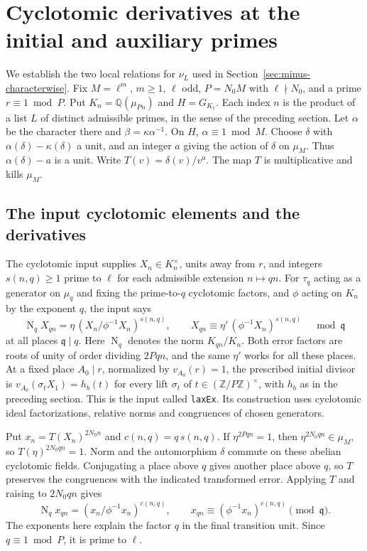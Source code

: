 \section{Cyclotomic derivatives at the initial and auxiliary primes}
\label{sec:minus-derivatives}

We establish the two local relations for \(\nu_L\) used in
Section~\ref{sec:minus-characterwise}. Fix \(M=\ell^m\), \(m\ge1\),
\(\ell\) odd, \(P=N_0M\) with \(\ell\nmid N_0\), and a prime
\(r\equiv1\bmod P\). Put \(K_n=\mathbb Q(\mu_{Pn})\) and
\(H=G_{K_1}\). Each index \(n\) is the product of a list \(L\) of
distinct admissible primes, in the sense of the preceding section.
Let \(\alpha\) be the character there and \(\beta=\kappa\alpha^{-1}\).
On \(H\), \(\alpha\equiv1\bmod M\). Choose
\(\delta\) with \(\alpha(\delta)-\kappa(\delta)\) a unit, and an
integer \(a\) giving the action of \(\delta\) on \(\mu_M\).
Thus \(\alpha(\delta)-a\) is a unit. Write \(T(v)=\delta(v)/v^a\).
The map \(T\) is multiplicative and kills \(\mu_M\).

\subsection{The input cyclotomic elements and the derivatives}

The cyclotomic input supplies \(X_n\in K_n^\times\), units away
from \(r\), and integers \(s(n,q)\ge1\) prime to
\(\ell\) for each admissible extension \(n\mapsto qn\).
For \(\tau_q\) acting as a generator on \(\mu_q\) and fixing the
prime-to-\(q\) cyclotomic factors, and \(\phi\) acting on \(K_n\)
by the exponent \(q\), the input says
\[
  \operatorname N_q X_{qn}
    =\eta\,(X_n/\phi^{-1}X_n)^{s(n,q)},\qquad
  X_{qn}\equiv\eta'\,(\phi^{-1}X_n)^{s(n,q)}\quad\bmod\mathfrak q
\]
at all places \(\mathfrak q\mid q\). Here \(\operatorname N_q\)
denotes the norm \(K_{qn}/K_n\). Both error factors are roots
of unity of order dividing \(2Pqn\), and the same \(\eta'\) works
for all these places. At a fixed place \(A_0\mid r\), normalized by
\(v_{A_0}(r)=1\), the prescribed initial divisor is
\(v_{A_0}(\sigma_t X_1)=h_b(t)\) for every lift \(\sigma_t\) of
\(t\in(\mathbb Z/P\mathbb Z)^\times\), with \(h_b\) as in the
preceding section. This is the input called \texttt{laxEx}. Its
construction uses cyclotomic ideal factorizations, relative norms
and congruences of chosen generators.

Put \(x_n=T(X_n)^{2N_0n}\) and \(c(n,q)=q\,s(n,q)\).
If \(\eta^{2Pqn}=1\), then \(\eta^{2N_0qn}\in\mu_M\), so
\(T(\eta)^{2N_0qn}=1\). Norm and the automorphism \(\delta\) commute
on these abelian cyclotomic fields. Conjugating a place above \(q\)
gives another place above \(q\), so \(T\) preserves the congruences
with the indicated transformed error. Applying \(T\) and raising
to \(2N_0qn\) gives
\begin{equation}
 \operatorname N_q x_{qn}=(x_n/\phi^{-1}x_n)^{c(n,q)},\qquad
 x_{qn}\equiv(\phi^{-1}x_n)^{c(n,q)}\pmod{\mathfrak q}.
 \label{eq:deriv-norm}
\end{equation}
The exponents here explain the factor \(q\) in the final transition
unit. Since \(q\equiv1\bmod P\), it is prime to \(\ell\).

